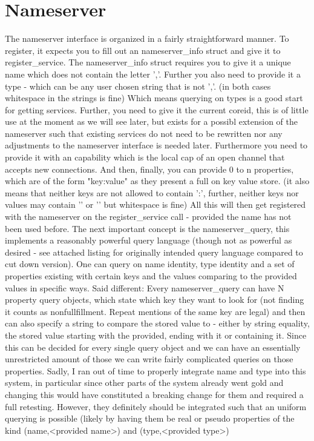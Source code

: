 \section{Nameserver}\label{s:nameserver}
The nameserver interface is organized in a fairly straightforward manner.
To register, it expects you to fill out an nameserver\_info struct and give it to register\_service.
The nameserver\_info struct requires you to give it a unique name which does not contain the letter ','. Further you also need to provide it a type - which can be any user chosen string that is not ','. (in both cases whitespace in the strings is fine) Which means querying on types is a good start for getting services.
Further, you need to give it the current coreid, this is of little use at the moment as we will see later, but exists for a possibl extension of the nameserver such that existing services do not need to be rewritten nor any adjustments to the nameserver interface is needed later.
Furthermore you need to provide it with an capability which is the local cap of an open channel that accepts new connections.
And then, finally, you can provide 0 to n properties, which are of the form "key:value" as they present a full on key value store. (it also means that neither keys are not allowed to contain ':', further, neither keys nor values may contain '{' or '}' but whitespace is fine)
All this will then get registered with the nameserver on the register\_service call - provided the name has not been used before.
The next important concept is the nameserver\_query, this implements a reasonably powerful query language (though not as powerful as desired - see attached listing for originally intended query language compared to cut down version). One can query on name identity, type identity and a set of properties existing with certain keys and the values comparing to the provided values in specific ways.
Said different: Every nameserver\_query can have N property query objects, which state which key they want to look for (not finding it counts as nonfullfillment. Repeat mentions of the same key are legal) and then can also specify a string to compare the stored value to - either by string equality, the stored value starting with the provided, ending with it or containing it.
Since this can be decided for every single query object and we can have an essentially unrestricted amount of those we can write fairly complicated queries on those properties.
Sadly, I ran out of time to properly integrate name and type into this system, in particular since other parts of the system already went gold and changing this would have constituted a breaking change for them and required a full retesting. However, they definitely should be integrated such that an uniform querying is possible (likely by having them be real or pseudo properties of the kind (name,<provided name>) and (type,<provided type>)
